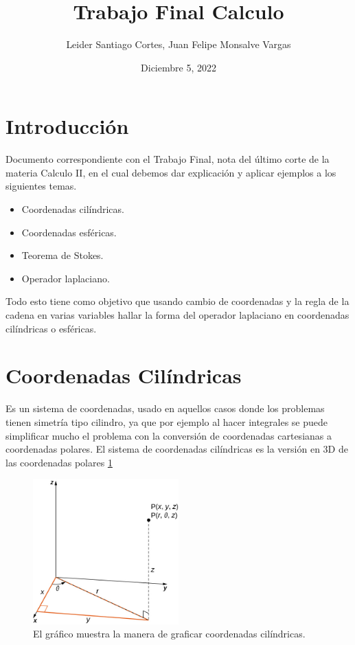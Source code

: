 \documentclass{article}
\title{Trabajo Final Calculo}
\author{Leider Santiago Cortes, Juan Felipe Monsalve Vargas}
\date{Diciembre 5, 2022}
\begin{document}
\maketitle

\section{Introducción}
Documento correspondiente con el Trabajo Final, nota del último corte de la materia Calculo II, en el cual debemos dar explicación y aplicar ejemplos a los siguientes temas.
\begin{itemize}
  \item Coordenadas cilíndricas.
  \item Coordenadas esféricas.
  \item Teorema de Stokes.
  \item Operador laplaciano.
\end{itemize}

Todo esto tiene como objetivo que usando cambio de coordenadas y la regla de la cadena en varias variables hallar la forma del operador laplaciano en coordenadas cilíndricas o esféricas.


\section{Coordenadas Cilíndricas}
Es un sistema de coordenadas, usado en aquellos casos donde los problemas tienen simetría tipo cilindro, ya que por ejemplo al hacer integrales se puede simplificar mucho el problema con la conversión de coordenadas cartesianas a coordenadas polares. El sistema de coordenadas cilíndricas es la versión en 3D de las coordenadas polares \ref{fig:polares_graf}


\begin{figure}[htp]
    \centering
    \includegraphics[width=0.5\textwidth]{polares_graf.jpg}
    \caption{El gráfico muestra la manera de graficar coordenadas cilíndricas.}
    \label{fig:polares_graf}
\end{figure}
\end{document}
